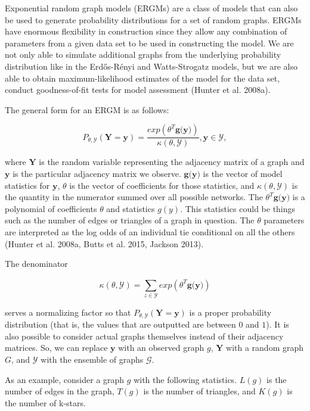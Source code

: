 \documentclass[12pt,twoside]{amherstthesis}
\begin{document}
  Exponential random graph models (ERGMs) are a class of models that can
  also be used to generate probability distributions for a set of random
  graphs. ERGMs have enormous flexibility in construction since they allow
  any combination of parameters from a given data set to be used in
  constructing the model. We are not only able to simulate additional
  graphs from the underlying probability distribution like in the
  Erdős-Rényi and Watts-Strogatz models, but we are also able to obtain
  maximum-likelihood estimates of the model for the data set, conduct
  goodness-of-fit tests for model assessment (Hunter et al. 2008a).
  
  The general form for an ERGM is as follows:
  
  \[P_{\theta, \mathcal{Y}}(\textbf{Y} = \textbf{y}) = \frac {exp(\theta^{T}\textbf{g(y)})} {\kappa(\theta, \mathcal{Y})},\textbf{y} \in \mathcal{Y}, \]
  
  where \(\textbf{Y}\) is the random variable representing the adjacency
  matrix of a graph and \(\textbf{y}\) is the particular adjacency matrix
  we observe. \(\textbf{g(y)}\) is the vector of model statistics for
  \(\textbf{y}\), \(\theta\) is the vector of coefficients for those
  statistics, and \(\kappa(\theta, \mathcal{Y})\) is the quantity in the
  numerator summed over all possible networks. The
  \(\theta^{T}\textbf{g(y)}\) is a polynomial of coefficients \(\theta\)
  and statistics \(g(y)\). This statistics could be things such as the
  number of edges or triangles of a graph in question. The \(\theta\)
  parameters are interpreted as the log odds of an individual tie
  conditional on all the others (Hunter et al. 2008a, Butts et al. 2015,
  Jackson 2013).
  
  The denominator
  
  \[\kappa(\theta, \mathcal{Y}) = \sum_{z \in \mathcal{Y}}^{} exp(\theta^{T}\textbf{g(y)})\]
  
  serves a normalizing factor so that
  \(P_{\theta, \mathcal{Y}}(\textbf{Y} = \textbf{y})\) is a proper
  probability distribution (that is, the values that are outputted are
  between \(0\) and \(1\)). It is also possible to consider actual graphs
  themselves instead of their adjacency matrices. So, we can replace
  \(\textbf{y}\) with an observed graph \(g\), \(\textbf{Y}\) with a
  random graph \(G\), and \(\mathcal{Y}\) with the ensemble of graphs
  \(\mathcal{G}\).
  
  As an example, consider a graph \(g\) with the following statistics.
  \(L(g)\) is the number of edges in the graph, \(T(g)\) is the number of
  triangles, and \(K(g)\) is the number of k-stars.
  
\end{document}
